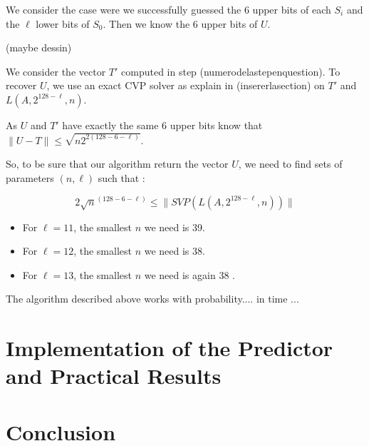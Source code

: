 \documentclass[preprint,svgnames]{iacrtrans}
\begin{document}
We consider the case were we successfully guessed the 6 upper bits of each \(S_i\) and the \(\ell\) lower bits of \(S_0\). Then we know the 6 upper bits of \(U\).

(maybe dessin)


We consider the vector \(T'\) computed in step (numerodelastepenquestion). To recover \(U\), we use an exact CVP solver as explain in  (insererlasection) on \(T'\) and \(L(A,2^{128-\ell},n)\).

As \(U\) and \(T'\) have exactly the same \(6\) upper bits  know that \(\lVert U-T \rVert \leqslant \sqrt{n2^{2(128-6-\ell)}}\).

So, to be sure that our algorithm return the vector \(U\), we need to find sets of parameters \((n,\ell)\) such that :	 

\[2\sqrt{n}^{(128-6-\ell)} \leqslant \lVert SVP(L(A,2^{128-\ell},n))\rVert \]

\begin{itemize}
	\item For \(\ell=11\), the smallest \(n\) we need is 39.
	
	\item For \(\ell=12\), the smallest \(n\) we need is 38.
	
	\item For \(\ell=13\), the smallest \(n\) we need is again 38 .
	
\end{itemize} 

\begin{theorem}
  The algorithm described above works with probability.... in time ...
\end{theorem}

\section{Implementation of the Predictor and Practical Results}

\section{Conclusion}




\end{document}
